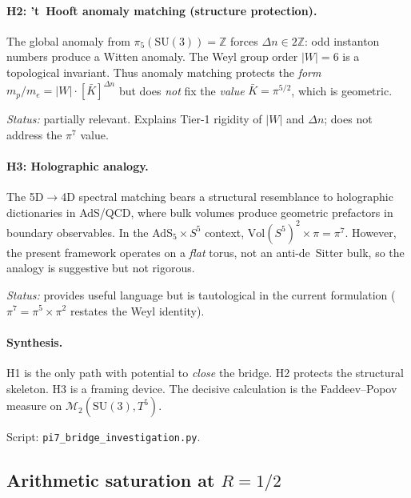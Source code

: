 \paragraph{H2: 't~Hooft anomaly matching (structure protection).}
The global anomaly from $\pi_5(\mathrm{SU}(3))=\mathbb{Z}$
forces $\Delta n\in 2\mathbb{Z}$: odd instanton numbers produce a
Witten anomaly.  The Weyl group order $|W|=6$ is a topological
invariant.  Thus anomaly matching protects the \emph{form}
$m_p/m_e=|W|\cdot[\bar K]^{\Delta n}$ but does \emph{not} fix the
\emph{value} $\bar K=\pi^{5/2}$, which is geometric.

\emph{Status:} partially relevant.  Explains Tier-1 rigidity
of $|W|$ and $\Delta n$; does not address the $\pi^7$ value.

\paragraph{H3: Holographic analogy.}
The 5D$\to$4D spectral matching bears a structural resemblance
to holographic dictionaries in AdS/QCD, where bulk volumes produce
geometric prefactors in boundary observables.
In the AdS$_5\times S^5$ context,
$\mathrm{Vol}(S^5)^2\times\pi=\pi^7$.
However, the present framework operates on a \emph{flat} torus,
not an anti-de~Sitter bulk, so the analogy is suggestive but not
rigorous.

\emph{Status:} provides useful language but is tautological in the
current formulation ($\pi^7=\pi^5\times\pi^2$ restates the Weyl
identity).

\paragraph{Synthesis.}
H1 is the only path with potential to \emph{close} the bridge.
H2 protects the structural skeleton.  H3 is a framing device.
The decisive calculation is the Faddeev--Popov measure on
$\mathcal{M}_2(\mathrm{SU}(3),T^5)$.

Script: \texttt{pi7\_bridge\_investigation.py}.


\subsection{Arithmetic saturation at $R=1/2$}
\label{sec:arithmetic_saturation}

